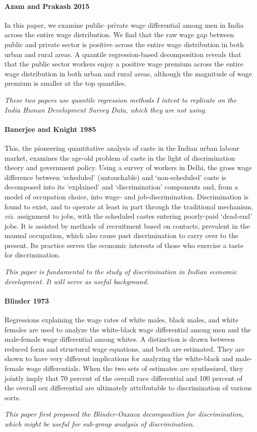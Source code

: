 \documentclass[a4paper]{article}
\begin{document}
\paragraph{Azam and Prakash 2015} In this paper, we examine public–private wage differential among men in India across the entire wage distribution. We find that the raw wage gap between public and private sector is positive across the entire wage distribution in both urban and rural areas. A quantile regression-based decomposition reveals that that the public sector workers enjoy a positive wage premium across the entire wage distribution in both urban and rural areas, although the magnitude of wage premium is smaller at the top quantiles.

\textit{These two papers use quantile regression methods I intent to replicate on the India Human Development Survey Data, which they are not using.}

\paragraph{Banerjee and Knight 1985} This, the pioneering quantitative analysis of caste in the Indian urban labour market, examines the age-old problem of caste in the light of discrimination theory and government policy. Using a survey of workers in Delhi, the gross wage difference between ‘scheduled’ (untouchable) and ‘non-scheduled’ caste is decomposed into its ‘explained’ and ‘discrimination’ components and, from a model of occupation choice, into wage- and job-discrimination. Discrimination is found to exist, and to operate at least in part through the traditional mechanism, \textit{viz.} assignment to jobs, with the scheduled castes entering poorly-paid ‘dead-end’ jobs. It is assisted by methods of recruitment based on contacts, prevalent in the manual occupation, which also cause past discrimination to carry over to the present. Its practice serves the economic interests of those who exercise a taste for discrimination.

\textit{This paper is fundamental to the study of discrimination in Indian economic development. It will serve as useful background.}

\paragraph{Blinder 1973} Regressions explaining the wage rates of white males, black males, and white females are used to analyze the white-black wage differential among men and the male-female wage differential among whites. A distinction is drawn between reduced form and structural wage equations, and both are estimated. They are shown to have very different implications for analyzing the white-black and male-female wage differentials. When the two sets of estimates are synthesized, they jointly imply that 70 percent of the overall race differential and 100 percent of the overall sex differential are ultimately attributable to discrimination of various sorts.

\textit{This paper first proposed the Blinder-Oaxaca decomposition for discrimination, which might be useful for sub-group analysis of discrimination.}
\end{document}
